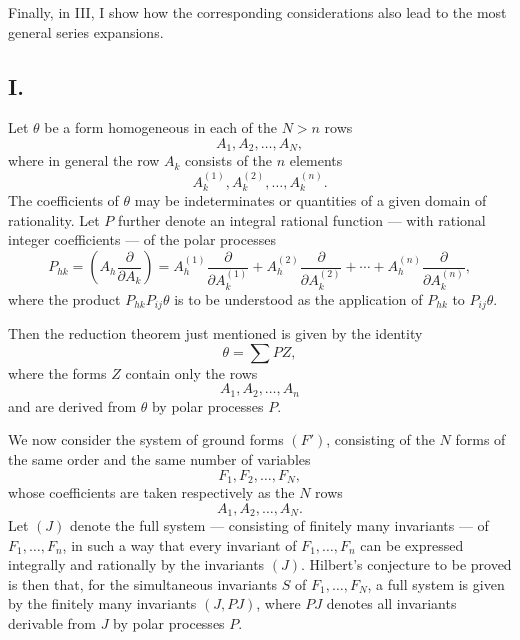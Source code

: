\documentclass[11pt]{article}
\begin{document}
Finally, in III, I show how the corresponding considerations also lead to the most general series expansions.

\subsection*{I.}
Let $\theta$ be a form homogeneous in each of the $N>n$ rows
\[
  A_1,A_2,\ldots,A_N,
\]
where in general the row $A_k$ consists of the $n$ elements
\[
  A_k^{(1)},A_k^{(2)},\ldots,A_k^{(n)}.
\]
The coefficients of $\theta$ may be indeterminates or quantities of a given domain of rationality. Let $P$ further denote an integral rational function --- with rational integer coefficients --- of the polar processes
\[
  P_{hk}=\left(A_h\frac{\partial}{\partial A_k}\right)
  =A_h^{(1)}\frac{\partial}{\partial A_k^{(1)}}+
   A_h^{(2)}\frac{\partial}{\partial A_k^{(2)}}+
   \cdots+
   A_h^{(n)}\frac{\partial}{\partial A_k^{(n)}},
\]
where the product $P_{hk}P_{ij}\theta$ is to be understood as the application of $P_{hk}$ to $P_{ij}\theta$.

Then the reduction theorem just mentioned is given by the identity
\begin{equation}
  \theta=\sum PZ,
\tag{1}
\end{equation}
where the forms $Z$ contain only the rows
\[
  A_1,A_2,\ldots,A_n
\]
and are derived from $\theta$ by polar processes $P$.

We now consider the system of ground forms $(F')$, consisting of the $N$ forms of the same order and the same number of variables
\[
  F_1,F_2,\ldots,F_N,
\]
whose coefficients are taken respectively as the $N$ rows
\[
  A_1,A_2,\ldots,A_N.
\]
Let $(J)$ denote the full system --- consisting of finitely many invariants --- of $F_1,
\ldots,F_n$, in such a way that every invariant of $F_1,
\ldots,F_n$ can be expressed integrally and rationally by the invariants $(J)$. Hilbert's conjecture to be proved is then that, for the simultaneous invariants $S$ of $F_1,
\ldots,F_N$, a full system is given by the finitely many invariants $(J,PJ)$, where $PJ$ denotes all invariants derivable from $J$ by polar processes $P$.
\end{document}
